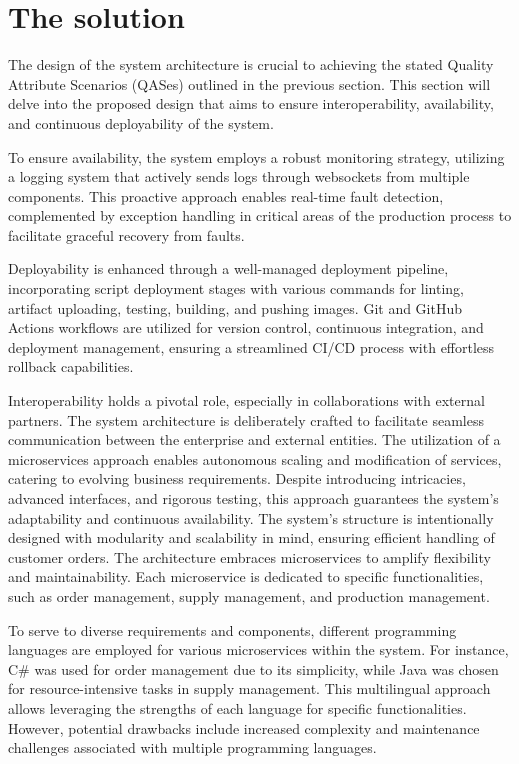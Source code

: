 \documentclass[conference]{IEEEtran}
\begin{document}
\section{The solution}
\label{sec:middleware_architecture}

The design of the system architecture is crucial to achieving the stated Quality Attribute Scenarios (QASes) outlined in the previous section. This section will delve into the proposed design that aims to ensure interoperability, availability, and continuous deployability of the system.

To ensure availability, the system employs a robust monitoring strategy, utilizing a logging system that actively sends logs through websockets from multiple components. This proactive approach enables real-time fault detection, complemented by exception handling in critical areas of the production process to facilitate graceful recovery from faults.

Deployability is enhanced through a well-managed deployment pipeline, incorporating script deployment stages with various commands for linting, artifact uploading, testing, building, and pushing images. Git and GitHub Actions workflows are utilized for version control, continuous integration, and deployment management, ensuring a streamlined CI/CD process with effortless rollback capabilities.

Interoperability holds a pivotal role, especially in collaborations with external partners. The system architecture is deliberately crafted to facilitate seamless communication between the enterprise and external entities. The utilization of a microservices approach enables autonomous scaling and modification of services, catering to evolving business requirements. Despite introducing intricacies, advanced interfaces, and rigorous testing, this approach guarantees the system's adaptability and continuous availability. The system's structure is intentionally designed with modularity and scalability in mind, ensuring efficient handling of customer orders. The architecture embraces microservices to amplify flexibility and maintainability. Each microservice is dedicated to specific functionalities, such as order management, supply management, and production management.

To serve to diverse requirements and components, different programming languages are employed for various microservices within the system. For instance, C\# was used for order management due to its simplicity, while Java was chosen for resource-intensive tasks in supply management. This multilingual approach allows leveraging the strengths of each language for specific functionalities.
However, potential drawbacks include increased complexity and maintenance challenges associated with multiple programming languages.
\end{document}
